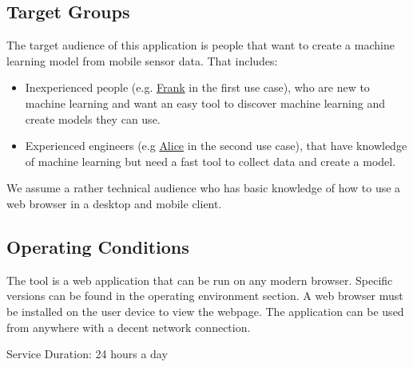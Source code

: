 \subsection{Target Groups}
The target audience of this application is people that want to create a machine learning model from mobile sensor data.
That includes:
\begin{itemize}
    \item Inexperienced people (e.g. \hyperref[ocfrank]{Frank} in the first use case), who are new to machine learning and want an easy tool to discover machine learning and create models they can use.
    \item Experienced engineers (e.g \hyperref[ocalice]{Alice} in the second use case), that have knowledge of machine learning but need a fast tool to collect data and create a model.
\end{itemize}
We assume a rather technical audience who has basic knowledge of how to use a web browser in a desktop and mobile client.

\subsection{Operating Conditions}
The tool is a web application that can be run on any modern browser. Specific versions can be found in the operating environment section. A web browser must be installed on the user device to view the webpage. The application can be used from anywhere with a decent network connection.

Service Duration: 24 hours a day